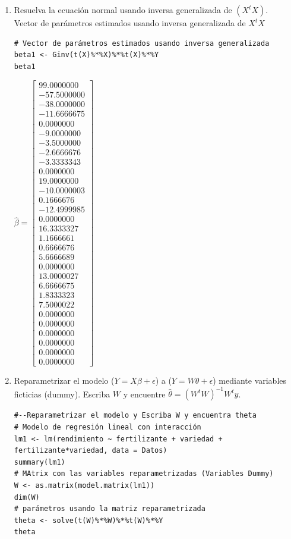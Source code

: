 \documentclass[10pt,a4paper]{report}
\begin{document}
\begin{enumerate}
    \item[4.] Resuelva la ecuación normal usando inversa generalizada de $({X}^{t}X)$.\\
Vector de parámetros estimados usando inversa generalizada de $X^{t}X$\\

\begin{verbatim}
# Vector de parámetros estimados usando inversa generalizada
beta1 <- Ginv(t(X)%*%X)%*%t(X)%*%Y
beta1
\end{verbatim}

$\hat{\beta}=\begin{bmatrix}
99.0000000\\
-57.5000000\\
-38.0000000\\
-11.6666675\\
0.0000000\\
-9.0000000\\
-3.5000000\\
-2.6666676\\
-3.3333343\\
0.0000000\\
19.0000000\\
-10.0000003\\
0.1666676\\
-12.4999985\\
0.0000000\\
16.3333327\\
1.1666661\\
0.6666676\\
5.6666689\\
0.0000000\\
13.0000027\\
6.6666675\\
1.8333323\\
7.5000022\\
0.0000000\\
0.0000000\\
0.0000000\\
0.0000000\\
0.0000000\\
0.0000000
\end{bmatrix}$
    
    
    \item[5.] Reparametrizar el modelo ($Y = X\beta + \epsilon$) a ($Y = W\theta + \epsilon$) mediante variables ficticias (dummy). Escriba $W$ y encuentre $\hat{\theta} = {\left({W}^{t}W\right)}^{-1}{W}^{t}y$. \\
\begin{verbatim}
#--Reparametrizar el modelo y Escriba W y encuentra theta
# Modelo de regresión lineal con interacción
lm1 <- lm(rendimiento ~ fertilizante + variedad + fertilizante*variedad, data = Datos)
summary(lm1)
# MAtrix con las variables reparametrizadas (Variables Dummy)
W <- as.matrix(model.matrix(lm1))
dim(W)
# parámetros usando la matriz reparametrizada
theta <- solve(t(W)%*%W)%*%t(W)%*%Y
theta


\end{verbatim}
\end{enumerate}
\end{document}
